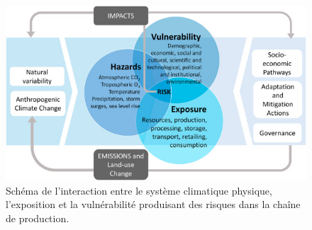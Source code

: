 \documentclass[../thesis.tex]{subfiles}
\begin{document}
    \vspace{1em}
    \begin{figure}[H]
        \centering
        \includegraphics[width=0.7\linewidth]{img/intro/global-food-system-3}
        \caption{Schéma de l'interaction entre le système climatique physique, l'exposition et la vulnérabilité produisant des risques dans la chaîne de production.}
        \label{fig:02-global-food-system}
    \end{figure}
    \vspace{1em}
    
    
    
\end{document}
